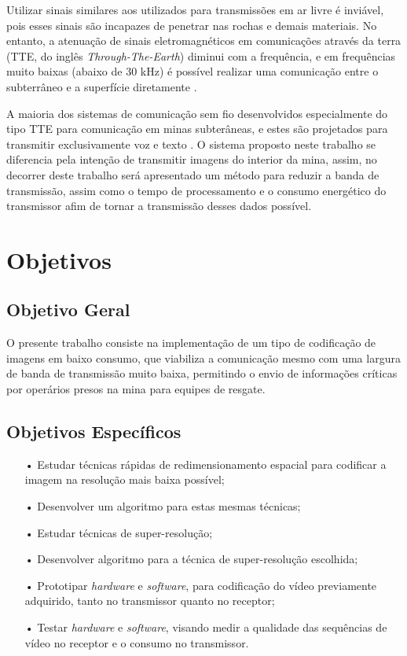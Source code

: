 Utilizar sinais similares aos utilizados para transmissões em ar livre é inviável, pois esses sinais são incapazes de penetrar nas rochas e demais materiais. No entanto, a atenuação de sinais eletromagnéticos em comunicações através da terra (TTE, do inglês \textit{Through-The-Earth}) diminui com a frequência, e em frequências muito baixas (abaixo de 30 kHz) é possível realizar uma comunicação entre o subterrâneo e a superfície diretamente \cite{bandyopadhyay2010wireless}.

A maioria dos sistemas de comunicação sem fio desenvolvidos especialmente do tipo TTE para comunicação em minas subterâneas, e estes são projetados para transmitir exclusivamente voz e texto \cite{link}. O sistema proposto neste trabalho se diferencia pela intenção de transmitir imagens do interior da mina, assim, no decorrer deste trabalho será apresentado um método para reduzir a banda de transmissão, assim como o tempo de processamento e o consumo energético do transmissor afim de tornar a transmissão desses dados possível.  

\section{Objetivos}
\label{OBJETIVOS}
\subsection{Objetivo Geral}

	O presente trabalho consiste na implementação de um tipo de codificação de imagens em baixo consumo, que viabiliza a comunicação mesmo com uma largura de banda de transmissão muito baixa, permitindo o envio de informações críticas por operários presos na mina para equipes de resgate.


\subsection{Objetivos Específicos}
\begin{itemize}
\item[•]Estudar técnicas rápidas de redimensionamento espacial para codificar a imagem na resolução mais baixa possível;
\item[•]Desenvolver um algoritmo para estas mesmas técnicas;
\item[•]Estudar técnicas de super-resolução;
\item[•]Desenvolver algoritmo para a técnica de super-resolução escolhida;
\item[•]Prototipar \textit{hardware} e \textit{software}, para codificação do vídeo previamente adquirido, tanto no transmissor quanto no receptor;
\item[•]Testar \textit{hardware} e \textit{software}, visando medir a qualidade das sequências de vídeo no receptor e o consumo no transmissor.
\end{itemize}